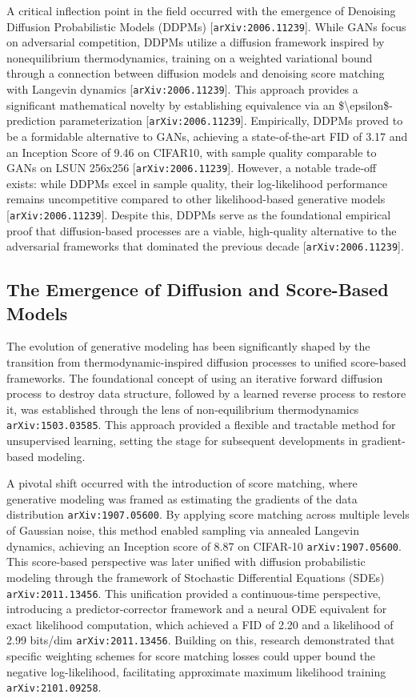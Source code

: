 \documentclass[11pt]{article}
\begin{document}
A critical inflection point in the field occurred with the emergence of Denoising Diffusion Probabilistic Models (DDPMs) [\texttt{arXiv:2006.11239}]. While GANs focus on adversarial competition, DDPMs utilize a diffusion framework inspired by nonequilibrium thermodynamics, training on a weighted variational bound through a connection between diffusion models and denoising score matching with Langevin dynamics [\texttt{arXiv:2006.11239}]. This approach provides a significant mathematical novelty by establishing equivalence via an \$\textbackslash{}epsilon\$-prediction parameterization [\texttt{arXiv:2006.11239}]. Empirically, DDPMs proved to be a formidable alternative to GANs, achieving a state-of-the-art FID of 3.17 and an Inception Score of 9.46 on CIFAR10, with sample quality comparable to GANs on LSUN 256x256 [\texttt{arXiv:2006.11239}]. However, a notable trade-off exists: while DDPMs excel in sample quality, their log-likelihood performance remains uncompetitive compared to other likelihood-based generative models [\texttt{arXiv:2006.11239}]. Despite this, DDPMs serve as the foundational empirical proof that diffusion-based processes are a viable, high-quality alternative to the adversarial frameworks that dominated the previous decade [\texttt{arXiv:2006.11239}].

\subsection{The Emergence of Diffusion and Score-Based Models}

The evolution of generative modeling has been significantly shaped by the transition from thermodynamic-inspired diffusion processes to unified score-based frameworks. The foundational concept of using an iterative forward diffusion process to destroy data structure, followed by a learned reverse process to restore it, was established through the lens of non-equilibrium thermodynamics \texttt{arXiv:1503.03585}. This approach provided a flexible and tractable method for unsupervised learning, setting the stage for subsequent developments in gradient-based modeling.

A pivotal shift occurred with the introduction of score matching, where generative modeling was framed as estimating the gradients of the data distribution \texttt{arXiv:1907.05600}. By applying score matching across multiple levels of Gaussian noise, this method enabled sampling via annealed Langevin dynamics, achieving an Inception score of 8.87 on CIFAR-10 \texttt{arXiv:1907.05600}. This score-based perspective was later unified with diffusion probabilistic modeling through the framework of Stochastic Differential Equations (SDEs) \texttt{arXiv:2011.13456}. This unification provided a continuous-time perspective, introducing a predictor-corrector framework and a neural ODE equivalent for exact likelihood computation, which achieved a FID of 2.20 and a likelihood of 2.99 bits/dim \texttt{arXiv:2011.13456}. Building on this, research demonstrated that specific weighting schemes for score matching losses could upper bound the negative log-likelihood, facilitating approximate maximum likelihood training \texttt{arXiv:2101.09258}.
\end{document}
